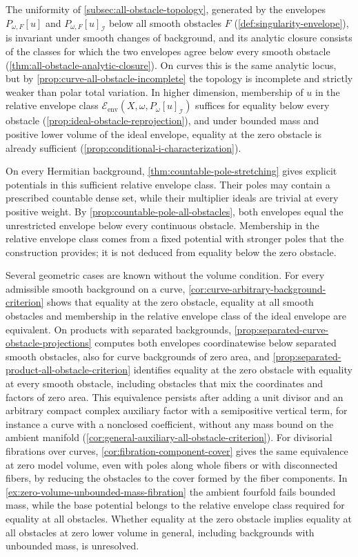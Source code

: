 The uniformity of \cref{subsec:all-obstacle-topology}, generated by the envelopes $P_{\omega,F}[u]$ and $P_{\omega,F}[u]_{\mathcal I}$ below all smooth obstacles $F$ (\cref{def:singularity-envelope}), is invariant under smooth changes of background, and its analytic closure consists of the classes for which the two envelopes agree below every smooth obstacle (\cref{thm:all-obstacle-analytic-closure}). On curves this is the same analytic locus, but by \cref{prop:curve-all-obstacle-incomplete} the topology is incomplete and strictly weaker than polar total variation. In higher dimension, membership of $u$ in the relative envelope class $\mathcal E_{\mathrm{env}}(X,\omega,P_\omega[u]_{\mathcal I})$ suffices for equality below every obstacle (\cref{prop:ideal-obstacle-reprojection}), and under bounded mass and positive lower volume of the ideal envelope, equality at the zero obstacle is already sufficient (\cref{prop:conditional-i-characterization}).

On every Hermitian background, \cref{thm:countable-pole-stretching} gives explicit potentials in this sufficient relative envelope class. Their poles may contain a prescribed countable dense set, while their multiplier ideals are trivial at every positive weight. By \cref{prop:countable-pole-all-obstacles}, both envelopes equal the unrestricted envelope below every continuous obstacle. Membership in the relative envelope class comes from a fixed potential with stronger poles that the construction provides; it is not deduced from equality below the zero obstacle.

Several geometric cases are known without the volume condition. For every admissible smooth background on a curve, \cref{cor:curve-arbitrary-background-criterion} shows that equality at the zero obstacle, equality at all smooth obstacles and membership in the relative envelope class of the ideal envelope are equivalent. On products with separated backgrounds, \cref{prop:separated-curve-obstacle-projections} computes both envelopes coordinatewise below separated smooth obstacles, also for curve backgrounds of zero area, and \cref{prop:separated-product-all-obstacle-criterion} identifies equality at the zero obstacle with equality at every smooth obstacle, including obstacles that mix the coordinates and factors of zero area. This equivalence persists after adding a unit divisor and an arbitrary compact complex auxiliary factor with a semipositive vertical term, for instance a curve with a nonclosed coefficient, without any mass bound on the ambient manifold (\cref{cor:general-auxiliary-all-obstacle-criterion}). For divisorial fibrations over curves, \cref{cor:fibration-component-cover} gives the same equivalence at zero model volume, even with poles along whole fibers or with disconnected fibers, by reducing the obstacles to the cover formed by the fiber components. In \cref{ex:zero-volume-unbounded-mass-fibration} the ambient fourfold fails bounded mass, while the base potential belongs to the relative envelope class required for equality at all obstacles. Whether equality at the zero obstacle implies equality at all obstacles at zero lower volume in general, including backgrounds with unbounded mass, is unresolved.

